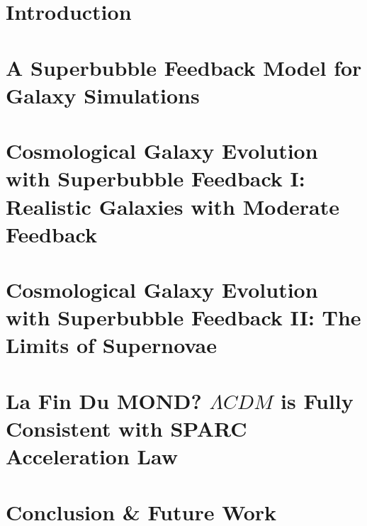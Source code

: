 \documentclass[letterpaper,12pt,twoside,openright]{report} %
\begin{document}
    \setcounter{secnumdepth}{3} %
    \tableofcontents %
    \cleardoublepage
    \listoffigures 
    \let\cleardoublepage\clearpage %
    \cleardoublepage
    \listoftables 
    \let\cleardoublepage\clearpage


    \pagestyle{fancy}
    \fancyhead{}
    \fancyfoot{}
    \fancyfoot[CE,CO]{\thepage}




\chapter{Introduction}

\chapter{A Superbubble Feedback Model for Galaxy Simulations}

\chapter{Cosmological Galaxy Evolution with Superbubble Feedback I: Realistic
Galaxies with Moderate Feedback}

\chapter{Cosmological Galaxy Evolution with Superbubble Feedback II: The Limits
of Supernovae}

\chapter{La Fin Du MOND? $\Lambda CDM$ is Fully Consistent with SPARC
Acceleration Law}

\chapter{Conclusion \& Future Work}
\end{document}
